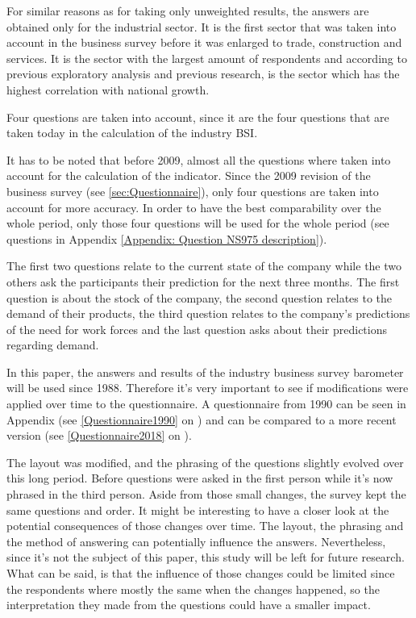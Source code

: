 \documentclass[12pt,a4paper,oneside]{book}
\begin{document}
For similar reasons as for taking only unweighted results, the answers are obtained only for the industrial sector.
It is the first sector that was taken into account in the business survey before it was enlarged to trade, construction and services. It is the sector with the largest amount of respondents and according to previous exploratory analysis and previous research, is the sector which has the highest correlation with national growth.

Four questions are taken into account, since it are the four questions that are taken today in the calculation of the industry BSI. 

It has to be noted that before 2009, almost all the questions where taken into account for the calculation of the indicator. Since the 2009 revision of the business survey (see \autoref{sec:Questionnaire}), only four questions are taken into account for more accuracy. In order to have the best comparability over the whole period, only those four questions will be used for the whole period (see questions in Appendix  \autoref{Appendix: Question NS975 description}).

The first two questions relate to the current state of the company while the two others ask the participants their prediction for the next three months.
The first question is about the stock of the company, 
the second question relates to the demand of their products, 
the third question relates to the company's predictions of the need for work forces and the last question asks about their predictions regarding demand.

In this paper, the answers and results of the industry business survey barometer will be used since 1988. Therefore it's very important to see if modifications were applied over time to the questionnaire.
A questionnaire from 1990 can be seen in Appendix (see \autoref{Questionnaire1990} on ) and can be compared to a more recent version (see \autoref{Questionnaire2018} on ).

The layout was modified, and the phrasing of the questions slightly evolved over this long period. Before questions were asked in the first person while it's now phrased in the third person. Aside from those small changes, the survey kept the same questions and order.
It might be interesting to have a closer look at the potential consequences of those changes over time. The layout, the phrasing and the method of answering can potentially influence the answers. Nevertheless, since it's not the subject of this paper, this study will be left for future research.
What can be said, is that the influence of those changes could be limited since the respondents where mostly the same when the changes happened, so the interpretation they made from the questions could have a smaller impact.
\end{document}
